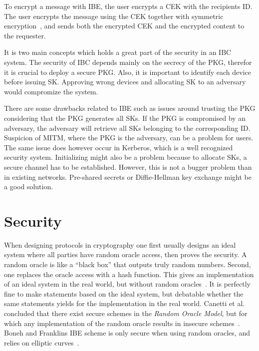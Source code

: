 To encrypt a message with \gls{IBE}, the user encrypts a \gls{CEK} with the recipients \gls{ID}.
The user encrypts the message using the \gls{CEK} together with symmetric encryption~\cite[section 2.2.2]{rfc5408}, and sends both the encrypted \gls{CEK} and the encrypted content to the requester. 

It is two main concepts which holds a great part of the security in an \gls{IBC} system.
The security of \gls{IBC} depends mainly on the secrecy of the \gls{PKG}, therefor it is crucial to deploy a secure \gls{PKG}.
Also, it is important to identify each device before issuing \gls{SK}.
Approving wrong devices and allocating \gls{SK} to an adversary would compromize the system.

There are some drawbacks related to \gls{IBE} such as issues around trusting the \gls{PKG} considering that the \gls{PKG} generates all \gls{SK}s.  
If the \gls{PKG} is compromised by an adversary, the adversary will retrieve all \gls{SK}s belonging to the corresponding \gls{ID}. 
Suspicion of \gls{MITM}, where the \gls{PKG} is the adversary, can be a problem for users.
The same issue does however occur in Kerberos, which is a well recognized security system.
Initializing might also be a problem because to allocate \gls{SK}s, a secure channel has to be established. 
However, this is not a bugger problem than in existing networks. 
Pre-shared secrets or Diffie-Hellman key exchange might be a good solution.

\section{Security}\label{ibe-secureness}
When designing protocols in cryptography one first usually designs an ideal system where all parties have random oracle access, then proves the security.
A random oracle is like a ``black box'' that outputs truly random numbers.
Second, one replaces the oracle access with a hash function.
This gives an implementation of an ideal system in the real world, but without random oracles~\cite{DBLP:conf/ccs/BellareR93}. 
It is perfectly fine to make statements based on the ideal system, but debatable whether the same statements yields for the implementation in the real world.
Canetti et al. concluded that there exist secure schemes in the \textit{Random Oracle Model}, but for which any implementation of the random oracle results in insecure schemes~\cite{DBLP:journals/jacm/CanettiGH04}.
Boneh and Franklins \gls{IBE} scheme is only secure when using random oracles, and relies on elliptic curves~\cite{DBLP:conf/crypto/BonehF01}.

